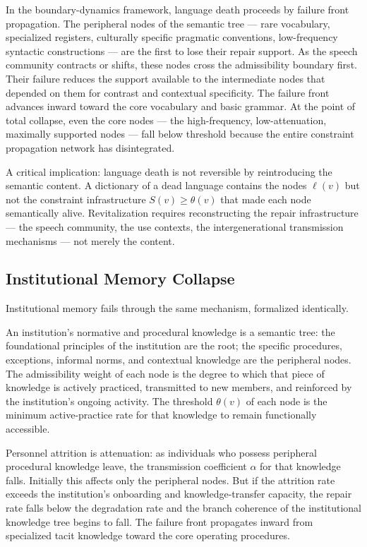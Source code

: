 \documentclass[11pt, a4paper]{article}
\theoremstyle{definition}
\theoremstyle{remark}
\begin{document}
In the boundary-dynamics framework, language death proceeds by failure front
propagation. The peripheral nodes of the semantic tree --- rare vocabulary,
specialized registers, culturally specific pragmatic conventions, low-frequency
syntactic constructions --- are the first to lose their repair support. As the
speech community contracts or shifts, these nodes cross the admissibility
boundary first. Their failure reduces the support available to the intermediate
nodes that depended on them for contrast and contextual specificity. The
failure front advances inward toward the core vocabulary and basic grammar.
At the point of total collapse, even the core nodes --- the high-frequency,
low-attenuation, maximally supported nodes --- fall below threshold because
the entire constraint propagation network has disintegrated.

A critical implication: language death is not reversible by reintroducing the
semantic content. A dictionary of a dead language contains the nodes $\ell(v)$
but not the constraint infrastructure $S(v) \geq \theta(v)$ that made each
node semantically alive. Revitalization requires reconstructing the repair
infrastructure --- the speech community, the use contexts, the intergenerational
transmission mechanisms --- not merely the content.

\subsection{Institutional Memory Collapse}

Institutional memory fails through the same mechanism, formalized identically.

An institution's normative and procedural knowledge is a semantic tree: the
foundational principles of the institution are the root; the specific procedures,
exceptions, informal norms, and contextual knowledge are the peripheral nodes.
The admissibility weight of each node is the degree to which that piece of
knowledge is actively practiced, transmitted to new members, and reinforced by
the institution's ongoing activity. The threshold $\theta(v)$ of each node
is the minimum active-practice rate for that knowledge to remain functionally
accessible.

Personnel attrition is attenuation: as individuals who possess peripheral
procedural knowledge leave, the transmission coefficient $\alpha$ for that
knowledge falls. Initially this affects only the peripheral nodes. But if
the attrition rate exceeds the institution's onboarding and knowledge-transfer
capacity, the repair rate falls below the degradation rate and the branch
coherence of the institutional knowledge tree begins to fall. The failure front
propagates inward from specialized tacit knowledge toward the core operating
procedures.
\end{document}
